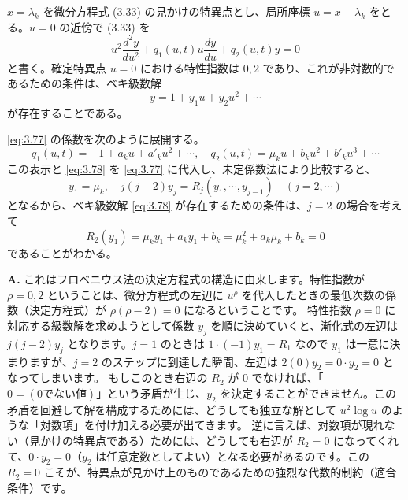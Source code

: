 \begin{story}
$x=\lambda_k$ を微分方程式 (3.33) の見かけの特異点とし、局所座標 $u = x - \lambda_k$ をとる。$u=0$ の近傍で (3.33) を
\begin{equation}
    u^2 \frac{d^2 y}{du^2} + q_1(u,t)u \frac{dy}{du} + q_2(u,t)y = 0 \label{eq:3.77}
\end{equation}
と書く。確定特異点 $u=0$ における特性指数は $0, 2$ であり、これが非対数的であるための条件は、ベキ級数解
\begin{equation}
    y = 1 + y_1 u + y_2 u^2 + \cdots \label{eq:3.78}
\end{equation}
が存在することである。

\begin{proposition}[対数項を持たないための適合条件]
\eqref{eq:3.77} の係数を次のように展開する。
\begin{equation*}
    q_1(u,t) = -1 + a_k u + a'_k u^2 + \cdots, \quad q_2(u,t) = \mu_k u + b_k u^2 + b'_k u^3 + \cdots
\end{equation*}
この表示と \eqref{eq:3.78} を \eqref{eq:3.77} に代入し、未定係数法により比較すると、
\begin{equation*}
    y_1 = \mu_k, \quad j(j-2)y_j = R_j(y_1, \cdots, y_{j-1}) \quad (j=2, \cdots)
\end{equation*}
となるから、ベキ級数解 \eqref{eq:3.78} が存在するための条件は、$j=2$ の場合を考えて
\begin{equation}
    R_2(y_1) = \mu_k y_1 + a_k y_1 + b_k = \mu_k^2 + a_k \mu_k + b_k = 0 \label{eq:3.79}
\end{equation}
であることがわかる。
\end{proposition}

\end{story}

\begin{Q}[【核心】なぜ $j(j-2)y_j = R_j$ において $j=2$ のとき、$R_2(y_1) = 0$ が「対数項を持たない条件」になるのか？]
\textbf{A.} これはフロベニウス法の決定方程式の構造に由来します。特性指数が $\rho = 0, 2$ ということは、微分方程式の左辺に $u^\rho$ を代入したときの最低次数の係数（決定方程式）が $\rho(\rho-2)=0$ になるということです。
特性指数 $\rho=0$ に対応する級数解を求めようとして係数 $y_j$ を順に決めていくと、漸化式の左辺は $j(j-2)y_j$ となります。$j=1$ のときは $1 \cdot (-1) y_1 = R_1$ なので $y_1$ は一意に決まりますが、$j=2$ のステップに到達した瞬間、左辺は $2(0)y_2 = 0 \cdot y_2 = 0$ となってしまいます。
もしこのとき右辺の $R_2$ が $0$ でなければ、「$0 = (\text{0でない値})$」という矛盾が生じ、$y_2$ を決定することができません。この矛盾を回避して解を構成するためには、どうしても独立な解として $u^2 \log u$ のような「対数項」を付け加える必要が出てきます。
逆に言えば、対数項が現れない（見かけの特異点である）ためには、どうしても右辺が $R_2 = 0$ になってくれて、$0 \cdot y_2 = 0$（$y_2$ は任意定数としてよい）となる必要があるのです。この $R_2=0$ こそが、特異点が見かけ上のものであるための強烈な代数的制約（適合条件）です。
\end{Q}


